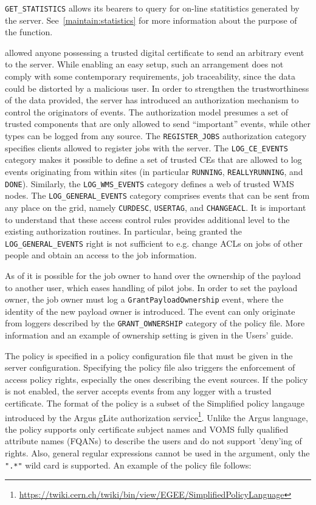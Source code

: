 \verb'GET_STATISTICS' allows its bearers to query for on-line statitistics
generated by the \LB server. See~\ref{maintain:statistics} for more
information about the purpose of the function.

 allowed anyone possessing a trusted digital certificate to send an
arbitrary event to the \LB server. While enabling an easy setup, such an
arrangement does not comply with some contemporary requirements, \eg job
traceability, since the data could be distorted by a malicious user.  In order
to strengthen the trustworthiness of the data provided, the 
server has introduced an authorization mechanism to control the originators
of events.  The authorization model presumes a set of trusted components
that are only allowed to send ``important'' events, while other types can be
logged from any source. The \verb'REGISTER_JOBS' authorization category
specifies clients allowed to register jobs with the \LB server. The
\verb'LOG_CE_EVENTS' category makes it possible to define a set of trusted
CEs that are allowed to log events originating from within sites (in
particular \verb'RUNNING', \verb'REALLYRUNNING', and \verb'DONE').
Similarly, the \verb'LOG_WMS_EVENTS' category defines a web of trusted WMS
nodes. The \verb'LOG_GENERAL_EVENTS' category comprises events that can be
sent from any place on the grid, namely \verb'CURDESC', \verb'USERTAG', and
\verb'CHANGEACL'. It is important to understand that these access control
rules provides additional level to the existing authorization routines.
In particular, being granted the \verb'LOG_GENERAL_EVENTS' right is not sufficient to
e.g. change ACLs on jobs of other people and obtain an access to the job information.

As of  it is possible for the job owner to hand over the ownership
of the payload to another user, which eases handling \eg of pilot jobs. In
order to set the payload owner, the job owner must log a
\verb'GrantPayloadOwnership' event, where the identity of the new
payload owner is introduced. The event can only originate from loggers
described by the \verb'GRANT_OWNERSHIP' category of the policy file. More
information and an example of ownership setting is given in the \LB Users'
guide.

The \LB policy is specified in a policy configuration file that must be given
in the server configuration. Specifying the policy file also triggers the
enforcement of access policy rights, especially the ones describing the event
sources. If the policy is not enabled, the \LB server accepts events from any
logger with a trusted certificate. The format of the policy is a subset of the
Simplified policy langauge introduced by the Argus gLite authorization
service\footnote{\url{https://twiki.cern.ch/twiki/bin/view/EGEE/SimplifiedPolicyLanguage}}.
Unlike the Argus language, the \LB policy supports only certificate subject
names and VOMS fully qualified attribute names (FQANs) to describe the users
and do not support 'deny'ing of rights.  Also, general regular expressions
cannot be used in the argument, only the \verb'".*"' wild card is supported. An
example of the policy file follows:

